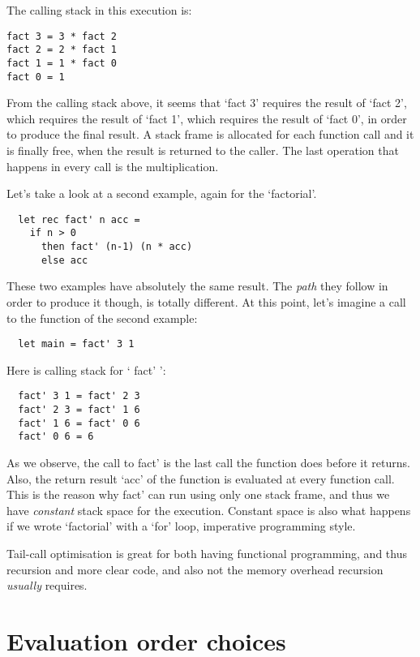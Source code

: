 \documentclass[diploma]{softlab-thesis}
\begin{document}
The calling stack in this execution is:
\begin{verbatim}
fact 3 = 3 * fact 2
fact 2 = 2 * fact 1
fact 1 = 1 * fact 0 
fact 0 = 1
\end{verbatim}

From the calling stack above, it seems that `fact 3' requires the result of `fact 2', which requires the result of `fact 1', which 
requires the result of `fact 0', in order to produce the final result. A stack frame is allocated for each function call and it is finally 
free, when the result is returned to the caller. The last operation that happens in every call is the multiplication.

Let's take a look at a second example, again for the `factorial'.
\begin{verbatim}
  let rec fact' n acc = 
    if n > 0 
      then fact' (n-1) (n * acc)
      else acc 
\end{verbatim}

These two examples have absolutely the same result. The \textit{path} they follow in order to produce it though, is totally different.
At this point, let's imagine a call to the function of the second example:
\begin{verbatim}
  let main = fact' 3 1
\end{verbatim}

Here is calling stack for ` fact' ':
\begin{verbatim}
  fact' 3 1 = fact' 2 3
  fact' 2 3 = fact' 1 6
  fact' 1 6 = fact' 0 6
  fact' 0 6 = 6
\end{verbatim}

As we observe, the call to fact' is the last call the function does before it returns. Also, the return result `acc' of the function is 
evaluated at every function call. This is the reason why fact' can run using only one stack frame, and thus we have \textit{constant} stack 
space for the execution. Constant space is also what happens if we wrote `factorial' with a `for' loop, imperative 
programming style. 

Tail-call optimisation is great for both having functional programming, and thus recursion and more clear code, and also not the 
memory overhead recursion \textit{usually} requires.

\section{Evaluation order choices}
\label{sec:evaluation-order}
\end{document}
